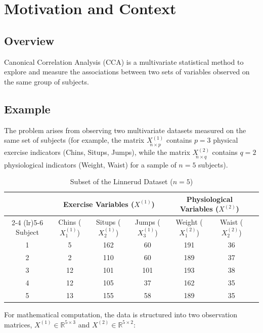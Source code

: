 
\section{Motivation and Context}
\subsection{Overview} Canonical Correlation Analysis (CCA) is a multivariate statistical method to explore and measure the associations between two sets of variables observed on the same group of subjects.
\subsection{Example}
The problem arises from observing two multivariate datasets measured on the same set of subjects (for example, the matrix $\underset{n \times p}{X^{(1)}}$ contains $p=3$ physical exercise indicators (Chins, Situps, Jumps), while the matrix $\underset{n \times q}{X^{(2)}}$ contains $q=2$ physiological indicators (Weight, Waist) for a sample of $n=5$ subjects).
\begin{table}[ht]
    \centering
    \caption{Subset of the Linnerud Dataset ($n=5$)}
    \vspace{0.2cm}
    \begin{tabular}{ccccccc}
        \toprule
        & \multicolumn{3}{c}{Exercise Variables ($X^{(1)}$)} & \multicolumn{2}{c}{Physiological Variables ($X^{(2)}$)} \\
        \cmidrule(lr){2-4} \cmidrule(lr){5-6}
        Subject & Chins ($X^{(1)}_1$) & Situps ($X^{(1)}_2$) & Jumps ($X^{(1)}_3$) & Weight ($X^{(2)}_1$) & Waist ($X^{(2)}_2$) \\
        \midrule
        1 & 5  & 162 & 60  & 191 & 36 \\
        2 & 2  & 110 & 60  & 189 & 37 \\
        3 & 12 & 101 & 101 & 193 & 38 \\
        4 & 12 & 105 & 37  & 162 & 35 \\
        5 & 13 & 155 & 58  & 189 & 35 \\
        \bottomrule
    \end{tabular}
\end{table}

For mathematical computation, the data is structured into two observation matrices, $X^{(1)} \in \mathbb{R}^{5 \times 3}$ and $X^{(2)} \in \mathbb{R}^{5 \times 2}$:

